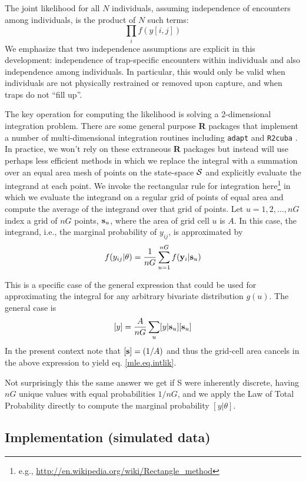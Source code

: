 The joint likelihood for all $N$ individuals, assuming independence of
encounters among individuals, is the product of $N$ such terms:
\[
          \prod_{i}  f(y[i,j])
\]
We emphasize that two independence assumptions are explicit in this
development: independence of trap-specific encounters within
individuals and also independence among individuals. In particular,
this would only be valid when individuals are not physically
restrained or removed upon capture, and when traps do not ``fill up''.

The key operation for computing the likelihood is solving a
2-dimensional integration problem. There are some general purpose {\bf
  R} packages that implement a number of 
 multi-dimensional integration routines
including \mbox{\tt adapt} \citep{genz_etal:2007} and \mbox{\tt R2cuba}
\citep{hahn_etal:2011}. In practice, we won't rely
on these extraneous {\bf R} packages but instead will use perhaps less
efficient methods in which we replace the integral with a summation
over an equal area mesh of points on the state-space ${\cal S}$ and explicitly
evaluate the integrand at each point. We invoke the rectangular rule
for integration here\footnote{e.g., 
\url{http://en.wikipedia.org/wiki/Rectangle_method}
} in which we
evaluate the
integrand on a regular grid of points of equal area and compute the
average of
the integrand over that grid of points. 
Let $u=1,2,\ldots,nG$ index a grid of
$nG$ points, ${\bf s}_{u}$,  where the area of grid cell $u$ is $A$.
In this case, the integrand, i.e., the marginal probability of
$y_{ij}$, is approximated by  
\begin{equation}
          f(y_{ij}|\theta) = \frac{1}{nG} \sum_{u=1}^{nG}  f( {\bold
            y}_{i} |{\bf s}_u)
\label{mle.eq.intlik}
\end{equation}

This is a specific case of the general expression that could be used
for approximating the integral for any arbitrary bivariate
distribution $g(u)$. The general case is
\[
[y]  = \frac{A}{nG} \sum_{u} [y|{\bf s}_{u}] [{\bf s}_{u}]
\]
 In the present context note that $[{\bf s}] = (1/A)$
and thus the grid-cell area cancels in the above
expression to yield eq. \ref{mle.eq.intlik}.

Not surprisingly this the same answer we get if {\cal S} were inherently
discrete, having $nG$ unique values with equal probabilities $1/nG$,
and we apply the Law of Total Probability directly to compute the
marginal probability  $[y|\theta]$.


\subsection{ Implementation (simulated data)}

